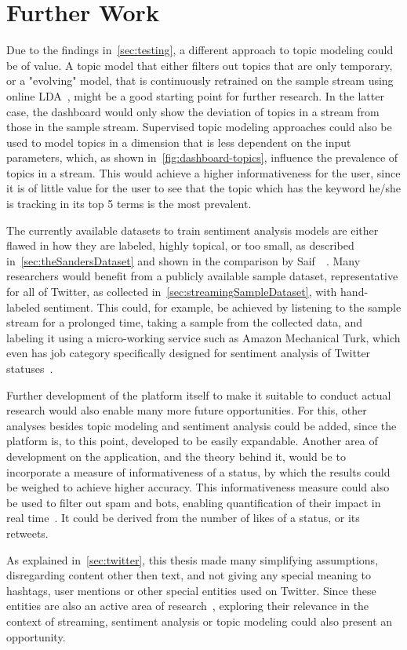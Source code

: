 \chapter{Further Work}
\label{ch:furtherWork}

Due to the findings in~\autoref{sec:testing},
a different approach to topic modeling could be of value.
A topic model that either filters out topics that are only temporary,
or a "evolving" model, that is continuously retrained on the sample stream using online LDA~\cite{hoffman2010online},
might be a good starting point for further research.
In the latter case, the dashboard would only show the deviation of topics in a stream from those in the sample stream.
Supervised topic modeling approaches could also be used to model topics in a dimension that is less dependent on the input parameters,
which, as shown in~\autoref{fig:dashboard-topics}, influence the prevalence of topics in a stream.
This would achieve a higher informativeness for the user, since it is of little value for the user to
see that the topic which has the keyword he/she is tracking in its top 5 terms is the most prevalent.
\par
The currently available datasets to train sentiment analysis models are either flawed in how they are labeled, highly topical,
or too small, as described in~\autoref{sec:theSandersDataset} and shown in the comparison by Saif~\etAl~\cite{Saif2013}.
Many researchers would benefit from a publicly available sample dataset, representative for all of Twitter,
as collected in~\autoref{sec:streamingSampleDataset}, with hand-labeled sentiment.
This could, for example, be achieved by listening to the sample stream for a prolonged time,
taking a sample from the collected data, and labeling it using a micro-working service such as Amazon Mechanical Turk,
which even has job category specifically designed for sentiment analysis of Twitter statuses~\cite{mturk}.
\par
Further development of the platform itself to make it suitable to conduct actual research
would also enable many more future opportunities.
For this, other analyses besides topic modeling and sentiment analysis could be added,
since the platform is, to this point, developed to be easily expandable.
Another area of development on the application, and the theory behind it,
would be to incorporate a measure of informativeness of a status,
by which the results could be weighed to achieve higher accuracy.
This informativeness measure could also be used to filter out spam and bots,
enabling quantification of their impact in real time~\cite{haustein2016tweets}.
It could be derived from the number of likes of a status, or its retweets.
\par
As explained in~\autoref{sec:twitter}, this thesis made many simplifying assumptions, disregarding content other then text, and not giving any special meaning
to hashtags, user mentions or other special entities used on Twitter.
Since these entities are also an active area of research~\cite{page2012linguistics},
exploring their relevance in the context of streaming, sentiment analysis or topic modeling
could also present an opportunity.
